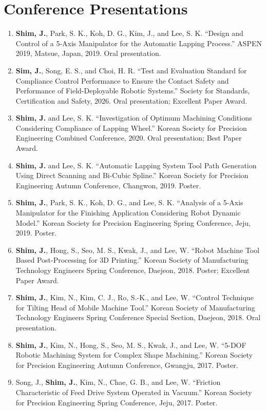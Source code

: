 \documentclass[10pt,letterpaper]{article}
\newcommand{\pub}[1]{\item #1}
\begin{document}
\section{Conference Presentations}
\begin{enumerate}[leftmargin=1.55em,itemsep=3pt,topsep=2pt]
  \pub{\textbf{Shim, J.}, Park, S. K., Koh, D. G., Kim, J., and Lee, S. K. ``Design and Control of a 5-Axis Manipulator for the Automatic Lapping Process.'' ASPEN 2019, Matsue, Japan, 2019. Oral presentation.}
  \pub{\textbf{Sim, J.}, Song, E. S., and Choi, H. R. ``Test and Evaluation Standard for Compliance Control Performance to Ensure the Contact Safety and Performance of Field-Deployable Robotic Systems.'' Society for Standards, Certification and Safety, 2026. Oral presentation; Excellent Paper Award.}
  \pub{\textbf{Shim, J.} and Lee, S. K. ``Investigation of Optimum Machining Conditions Considering Compliance of Lapping Wheel.'' Korean Society for Precision Engineering Combined Conference, 2020. Oral presentation; Best Paper Award.}
  \pub{\textbf{Shim, J.} and Lee, S. K. ``Automatic Lapping System Tool Path Generation Using Direct Scanning and Bi-Cubic Spline.'' Korean Society for Precision Engineering Autumn Conference, Changwon, 2019. Poster.}
  \pub{\textbf{Shim, J.}, Park, S. K., Koh, D. G., and Lee, S. K. ``Analysis of a 5-Axis Manipulator for the Finishing Application Considering Robot Dynamic Model.'' Korean Society for Precision Engineering Spring Conference, Jeju, 2019. Poster.}
  \pub{\textbf{Shim, J.}, Hong, S., Seo, M. S., Kwak, J., and Lee, W. ``Robot Machine Tool Based Post-Processing for 3D Printing.'' Korean Society of Manufacturing Technology Engineers Spring Conference, Daejeon, 2018. Poster; Excellent Paper Award.}
  \pub{\textbf{Shim, J.}, Kim, N., Kim, C. J., Ro, S.-K., and Lee, W. ``Control Technique for Tilting Head of Mobile Machine Tool.'' Korean Society of Manufacturing Technology Engineers Spring Conference Special Section, Daejeon, 2018. Oral presentation.}
  \pub{\textbf{Shim, J.}, Kim, N., Hong, S., Seo, M. S., Kwak, J., and Lee, W. ``5-DOF Robotic Machining System for Complex Shape Machining.'' Korean Society for Precision Engineering Autumn Conference, Gwangju, 2017. Poster.}
  \pub{Song, J., \textbf{Shim, J.}, Kim, N., Chae, G. B., and Lee, W. ``Friction Characteristic of Feed Drive System Operated in Vacuum.'' Korean Society for Precision Engineering Spring Conference, Jeju, 2017. Poster.}
\end{enumerate}
\end{document}
